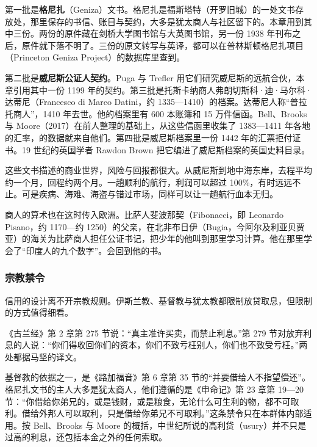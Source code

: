第一批是\textbf{格尼扎}（Geniza）文书。格尼扎是福斯塔特（开罗旧城）的一处文书存放处\cite{greif2012}，那里保存的书信、账目与契约，大多是犹太商人与社区留下的。本章用到其中三份。两份的原件藏在剑桥大学图书馆与大英图书馆，另一份 1938 年刊布之后，原件就下落不明了。三份的原文转写与英译，都可以在普林斯顿格尼扎项目（Princeton Geniza Project）的数据库里查到\cite{pgp39110,pgp6039,pgp2367}。

第二批是\textbf{威尼斯公证人契约}。Puga 与 Trefler 用它们研究威尼斯的远航合伙，本章引用其中一份 1199 年的契约\cite{puga2014}。第三批是托斯卡纳商人弗朗切斯科·迪·马尔科·达蒂尼（Francesco di Marco Datini，约 1335—1410）的档案。达蒂尼人称“普拉托商人”，1410 年去世。他的档案里有 600 本账簿和 15 万件信函\cite{bell2017}。Bell、Brooks 与 Moore（2017）在前人整理的基础上，从这些信函里收集了 1383—1411 年各地的汇率，的数据就来自他们。第四批是威尼斯档案里一份 1442 年的汇票拒付证书。19 世纪的英国学者 Rawdon Brown 把它编进了威尼斯档案的英国史料目录\cite{brown1867}。

这些文书描述的商业世界，风险与回报都很大。从威尼斯到地中海东岸，去程平均约一个月，回程约两个月。一趟顺利的航行，利润可以超过 100\%，有时远远不止\cite{puga2014}。可是疾病、海难、海盗与错过市场，同样可以让一趟航行血本无归。

商人的算术也在这时传入欧洲。比萨人斐波那契（Fibonacci，即 Leonardo Pisano，约 1170—约 1250）的父亲，在北非布日伊（Bugia，今阿尔及利亚贝贾亚）的海关为比萨商人担任公证书记，把少年的他叫到那里学习计算。他在那里学会了“印度人的九个数字”\cite{fibonacci1857}。会回到他的书。

\subsubsection{宗教禁令}
信用的设计离不开宗教规则。伊斯兰教、基督教与犹太教都限制放贷取息，但限制的方式值得细看。

《古兰经》第 2 章第 275 节说：“真主准许买卖，而禁止利息。”第 279 节对放弃利息的人说：“你们得收回你们的资本，你们不致亏枉别人，你们也不致受亏枉。”\cite{quranmajian}两处都据马坚的译文。

基督教的依据之一，是《路加福音》第 6 章第 35 节的“并要借给人不指望偿还”\cite{cuvbible}。格尼扎文书的主人大多是犹太商人，他们遵循的是《申命记》第 23 章第 19—20 节：“你借给你弟兄的，或是钱财，或是粮食，无论什么可生利的物，都不可取利。借给外邦人可以取利，只是借给你弟兄不可取利。”\cite{cuvbible}这条禁令只在本群体内部适用。按 Bell、Brooks 与 Moore 的概括，中世纪所说的高利贷（usury）并不只是过高的利息，还包括本金之外的任何索取\cite{bell2017}。


